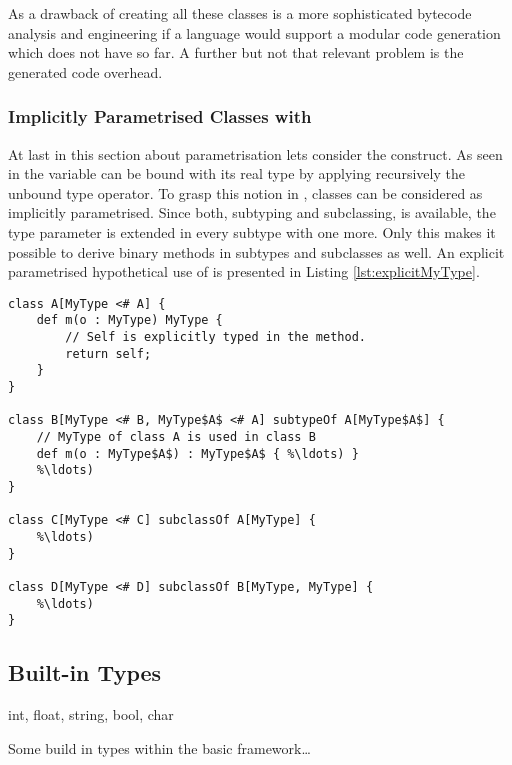As a drawback of creating all these classes is a more sophisticated 
bytecode analysis and engineering if a language would support a modular
code generation which \ooplss does not have so far. A further but not 
that relevant problem is the generated code overhead.

\subsubsection{Implicitly Parametrised Classes with \mytype}
At last in this section about parametrisation lets consider the \mytype
construct. As seen in  the \self variable
can be bound with its real type by applying recursively the unbound type
operator. To grasp this notion in \ooplss, classes can be considered
as implicitly parametrised. Since both, subtyping and subclassing, is
available, the type parameter is extended in every subtype with one more.
Only this makes it possible to derive binary methods in subtypes
and subclasses as well. An explicit parametrised hypothetical use of
\mytype is presented in Listing \ref{lst:explicitMyType}.

\begin{lstlisting}[float,language=ooplss,caption=Explicit \mytype,label=lst:explicitMyType]
class A[MyType <# A] {
	def m(o : MyType) MyType {
		// Self is explicitly typed in the method.
		return self;
	}
}

class B[MyType <# B, MyType$A$ <# A] subtypeOf A[MyType$A$] {
	// MyType of class A is used in class B
	def m(o : MyType$A$) : MyType$A$ { %\ldots) }
	%\ldots)
}

class C[MyType <# C] subclassOf A[MyType] {
	%\ldots)
}

class D[MyType <# D] subclassOf B[MyType, MyType] {
	%\ldots)
}
\end{lstlisting}




\subsection{Built-in Types}


int, float, string, bool, char


Some build in types within the basic framework\ldots


